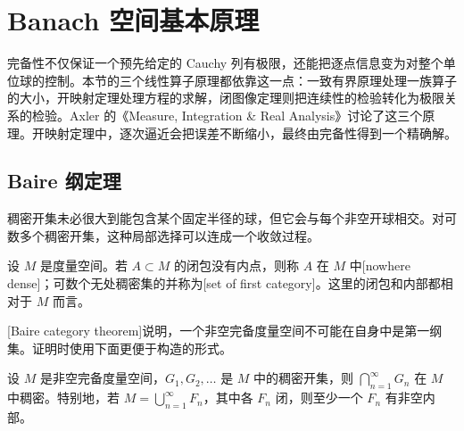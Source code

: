 \section{Banach 空间基本原理}
\label{b1:sec:0803}

完备性不仅保证一个预先给定的 Cauchy 列有极限，还能把逐点信息变为对整个单位球的控制。本节的三个线性算子原理都依靠这一点：一致有界原理处理一族算子的大小，开映射定理处理方程的求解，闭图像定理则把连续性的检验转化为极限关系的检验。Axler 的《Measure, Integration \& Real Analysis》\cite[Section 6E]{Axler2020Measure}讨论了这三个原理。开映射定理中，逐次逼近会把误差不断缩小，最终由完备性得到一个精确解。


\subsection{Baire 纲定理}
\label{b1:subsec:080301}

稠密开集未必很大到能包含某个固定半径的球，但它会与每个非空开球相交。对可数多个稠密开集，这种局部选择可以连成一个收敛过程。

\begin{definition}
\label{b1:def:category-of-sets}
设 \(M\) 是度量空间。若 \(A\subset M\) 的闭包没有内点，则称 \(A\) 在 \(M\) 中[nowhere dense]；可数个无处稠密集的并称为[set of first category]。这里的闭包和内部都相对于 \(M\) 而言。
\end{definition}

[Baire category theorem]说明，一个非空完备度量空间不可能在自身中是第一纲集。证明时使用下面更便于构造的形式。

\begin{theorem}[Baire 纲]
\label{b1:thm:baire}
设 \(M\) 是非空完备度量空间，\(G_1,G_2,\ldots\) 是 \(M\) 中的稠密开集，则 \(\bigcap_{n=1}^{\infty}G_n\) 在 \(M\) 中稠密。特别地，若 \(M=\bigcup_{n=1}^{\infty}F_n\)，其中各 \(F_n\) 闭，则至少一个 \(F_n\) 有非空内部。
\end{theorem}

